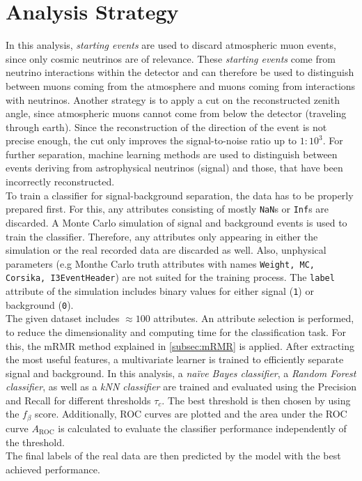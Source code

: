 \section{Analysis Strategy}
\label{sec:Strategy}
In this analysis, \textit{starting events} are used to discard atmospheric muon events, since only cosmic neutrinos are of relevance. These \textit{starting events} come from neutrino
interactions within the detector and can therefore be used to distinguish between muons coming from the atmosphere and muons coming from interactions with neutrinos. Another strategy is 
to apply a cut on the reconstructed zenith angle, since atmospheric muons cannot come from below the detector (traveling through earth).
Since the reconstruction of the direction of the event is not precise enough, the cut only improves the signal-to-noise ratio up to $1:10^3$. For further separation, machine learning
methods are used to distinguish between events deriving from astrophysical neutrinos (signal) and those, that have been incorrectly reconstructed.\\
To train a classifier for signal-background separation, the data has to be properly prepared first. For this, any attributes consisting of mostly \texttt{NaN}s or \texttt{Inf}s are discarded.
A Monte Carlo simulation of signal and background events is used to train the classifier. Therefore, any attributes only appearing in either the simulation or the real recorded data are
discarded as well. Also, unphysical parameters (e.g Monthe Carlo truth attributes with names \texttt{Weight, MC, Corsika, I3EventHeader}) are not suited for the training process. The \texttt{label}
attribute of the simulation includes binary values for either signal (\texttt{1}) or background (\texttt{0}).\\
The given dataset includes $\approx 100$ attributes. An attribute selection is performed, to reduce the dimensionality and computing time for the classification task. For this, the mRMR method explained
in \ref{subsec:mRMR} is applied. After extracting the most useful features, a multivariate learner is trained to efficiently separate signal and background. In this analysis, a \textit{na\"ive Bayes classifier},
a \textit{Random Forest classifier}, as well as a \textit{kNN classifier} are trained and evaluated using the Precision and Recall for different thresholds $\tau_c$. The best threshold is then chosen by 
using the $f_{\beta}$ score. Additionally, ROC curves are plotted and the area under the ROC curve $A_{\mathrm{ROC}}$ is calculated to evaluate the classifier performance independently of the threshold.\\
The final labels of the real data are then predicted by the model with the best achieved performance.

